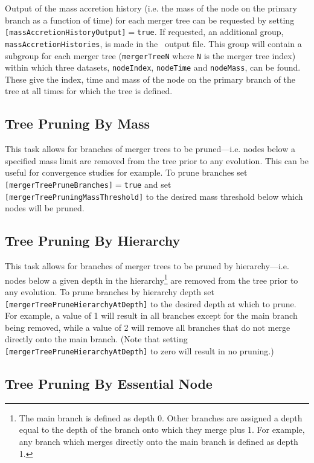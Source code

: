 Output of the mass accretion history (i.e. the mass of the \gls{node} on the primary branch as a function of time) for each merger tree can be requested by setting {\tt [massAccretionHistoryOutput]}$=${\tt true}. If requested, an additional group, {\tt massAccretionHistories}, is made in the \glc\ output file. This group will contain a subgroup for each merger tree ({\tt mergerTreeN} where {\tt N} is the merger tree index) within which three datasets, {\tt nodeIndex}, {\tt nodeTime} and {\tt nodeMass}, can be found. These give the index, time and mass of the \gls{node} on the primary branch of the tree at all times for which the tree is defined.

\subsection{Tree Pruning By Mass}

This task allows for branches of merger trees to be pruned---i.e. nodes below a specified mass limit are removed from the tree prior to any evolution. This can be useful for convergence studies for example. To prune branches set {\tt [mergerTreePruneBranches]}$=${\tt true} and set {\tt [mergerTreePruningMassThreshold]} to the desired mass threshold below which nodes will be pruned.

\subsection{Tree Pruning By Hierarchy}

This task allows for branches of merger trees to be pruned by hierarchy---i.e. nodes below a given depth in the hierarchy\footnote{The main branch is defined as depth 0. Other branches are assigned a depth equal to the depth of the branch onto which they merge plus 1. For example, any branch which merges directly onto the main branch is defined as depth 1.} are removed from the tree prior to any evolution.  To prune branches by hierarchy depth set {\tt [mergerTreePruneHierarchyAtDepth]} to the desired depth at which to prune. For example, a value of 1 will result in all branches except for the main branch being removed, while a value of 2 will remove all branches that do not merge directly onto the main branch. (Note that setting {\tt [mergerTreePruneHierarchyAtDepth]} to zero will result in no pruning.)

\subsection{Tree Pruning By Essential Node}

